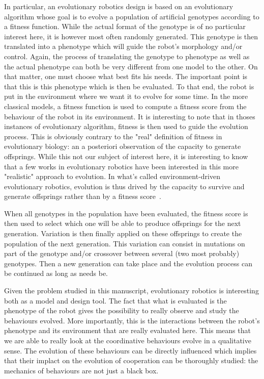 
    In particular, an evolutionary robotics design is based on an evolutionary algorithm whose goal is to evolve a population of artificial genotypes according to a fitness function. While the actual format of the genotype is of no particular interest here, it is however most often randomly generated. This genotype is then translated into a phenotype which will guide the robot's morphology and/or control. Again, the process of translating the genotype to phenotype as well as the actual phenotype can both be very different from one model to the other. On that matter, one must choose what best fits his needs. The important point is that this is this phenotype which is then be evaluated. To that end, the robot is put in the environment where we want it to evolve for some time. 
    In the more classical models, a fitness function is used to compute a fitness score from the behaviour of the robot in its environment. It is interesting to note that in thoses instances of evolutionary algorithm, fitness is then used to guide the evolution process. This is obviously contrary to the "real" definition of fitness in evolutionary biology: an a posteriori observation of the capacity to generate offsprings. While this not our subject of interest here, it is interesting to know that a few works in evolutionary robotics have been interested in this more "realistic" approach to evolution. In what's called environment-driven evolutionary robotics, evolution is thus drived by the capacity to survive and generate offsprings rather than by a fitness score~\cite{Ray1991, Bianco2004, Bredeche2010}.

    When all genotypes in the population have been evaluated, the fitness score is then used to select which one will be able to produce offsprings for the next generation. Variation is then finally applied on these offsprings to create the population of the next generation. This variation can consist in mutations on part of the genotype and/or crossover between several (two most probably) genotypes. Then a new generation can take place and the evolution process can be continued as long as needs be.

    Given the problem studied in this manuscript, evolutionary robotics is interesting both as a model and design tool. The fact that what is evaluated is the phenotype of the robot gives the possibility to really observe and study the behaviours evolved. More importantly, this is the interactions between the robot's phenotype and its environment that are really evaluated here. This means that we are able to really look at the coordinative behaviours evolve in a qualitative sense. The evolution of these behaviours can be directly influenced which implies that their implact on the evolution of cooperation can be thoroughly studied: the mechanics of behaviours are not just a black box.

